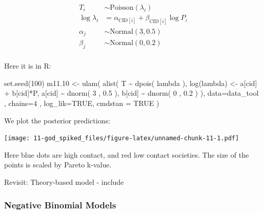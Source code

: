 \documentclass[
]{book}
\newenvironment{Shaded}{\begin{snugshade}}{\end{snugshade}}
\newcommand{\AttributeTok}[1]{\textcolor[rgb]{0.77,0.63,0.00}{#1}}
\newcommand{\ConstantTok}[1]{\textcolor[rgb]{0.00,0.00,0.00}{#1}}
\newcommand{\DecValTok}[1]{\textcolor[rgb]{0.00,0.00,0.81}{#1}}
\newcommand{\FloatTok}[1]{\textcolor[rgb]{0.00,0.00,0.81}{#1}}
\newcommand{\FunctionTok}[1]{\textcolor[rgb]{0.00,0.00,0.00}{#1}}
\newcommand{\NormalTok}[1]{#1}
\newcommand{\OtherTok}[1]{\textcolor[rgb]{0.56,0.35,0.01}{#1}}
\newcommand{\SpecialCharTok}[1]{\textcolor[rgb]{0.00,0.00,0.00}{#1}}
\begin{document}
\[
\begin{aligned}
T_i &\sim \text{Poisson}(\lambda_i) \\
\log \lambda_i &= \alpha_{\text{CID}[i]}+ \beta_{\text{CID}[i]} \log P_i \\
\alpha_j &\sim \text{Normal}(3,0.5) \\
\beta_j &\sim \text{Normal}(0,0.2)\\
\end{aligned}
\]

Here it is in R:

\begin{Shaded}
\begin{Highlighting}[]
\FunctionTok{set.seed}\NormalTok{(}\DecValTok{100}\NormalTok{)}
\NormalTok{m11}\FloatTok{.10} \OtherTok{\textless{}{-}} \FunctionTok{ulam}\NormalTok{( }\FunctionTok{alist}\NormalTok{( }
\NormalTok{  T }\SpecialCharTok{\textasciitilde{}} \FunctionTok{dpois}\NormalTok{( lambda ), }
  \FunctionTok{log}\NormalTok{(lambda) }\OtherTok{\textless{}{-}}\NormalTok{ a[cid] }\SpecialCharTok{+}\NormalTok{ b[cid]}\SpecialCharTok{*}\NormalTok{P, }
\NormalTok{  a[cid] }\SpecialCharTok{\textasciitilde{}} \FunctionTok{dnorm}\NormalTok{( }\DecValTok{3}\NormalTok{ , }\FloatTok{0.5}\NormalTok{ ), }
\NormalTok{  b[cid] }\SpecialCharTok{\textasciitilde{}} \FunctionTok{dnorm}\NormalTok{( }\DecValTok{0}\NormalTok{ , }\FloatTok{0.2}\NormalTok{ )}
\NormalTok{), }\AttributeTok{data=}\NormalTok{data\_tool , }\AttributeTok{chains=}\DecValTok{4}\NormalTok{ , }\AttributeTok{log\_lik=}\ConstantTok{TRUE}\NormalTok{, }\AttributeTok{cmdstan =} \ConstantTok{TRUE}\NormalTok{ )}
\end{Highlighting}
\end{Shaded}

We plot the posterior predictions:

\texttt{[image: 11-god\_spiked\_files/figure-latex/unnamed-chunk-11-1.pdf]}

Here blue dots are high contact, and red low contact societies. The size of the points is scaled by Pareto k-value.

Revisit: Theory-based model - include

\hypertarget{negative-binomial-models}{%
\subsubsection*{Negative Binomial Models}\label{negative-binomial-models}}
\end{document}
